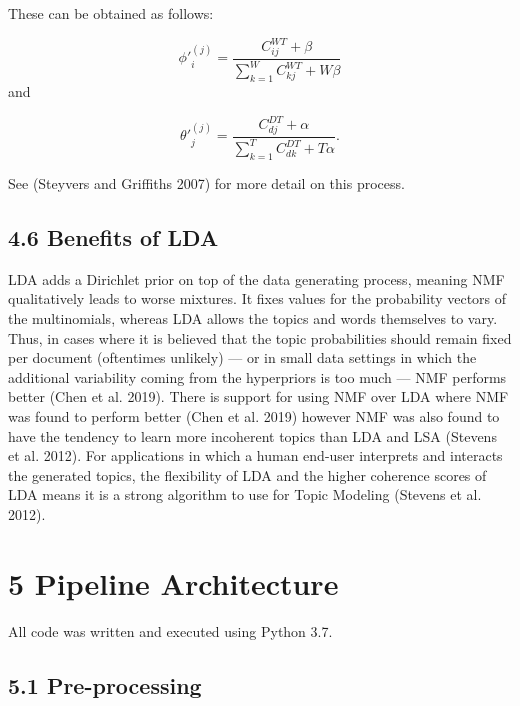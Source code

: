 \documentclass[
]{article}
\begin{document}
These can be obtained as follows:

\begin{equation}
{\phi}'^{(j)}_i= \frac{C^{WT}_{ij} + \beta}{\sum_{k=1}^{W}C^{WT}_{kj} + W\beta}
\end{equation} and

\begin{equation}
{\theta}'^{(j)}_j= \frac{C^{DT}_{dj} + \alpha}{\sum_{k=1}^{T}C^{DT}_{dk} + T\alpha}.
\end{equation}

See (Steyvers and Griffiths 2007) for more detail on this process.

\hypertarget{benefits-of-lda}{%
\subsection{4.6 Benefits of LDA}\label{benefits-of-lda}}

LDA adds a Dirichlet prior on top of the data generating process,
meaning NMF qualitatively leads to worse mixtures. It fixes values for
the probability vectors of the multinomials, whereas LDA allows the
topics and words themselves to vary. Thus, in cases where it is believed
that the topic probabilities should remain fixed per document
(oftentimes unlikely) --- or in small data settings in which the
additional variability coming from the hyperpriors is too much --- NMF
performs better (Chen et al. 2019). There is support for using NMF over
LDA where NMF was found to perform better (Chen et al. 2019) however NMF
was also found to have the tendency to learn more incoherent topics than
LDA and LSA (Stevens et al. 2012). For applications in which a human
end-user interprets and interacts the generated topics, the flexibility
of LDA and the higher coherence scores of LDA means it is a strong
algorithm to use for Topic Modeling (Stevens et al. 2012).

\newpage

\newpage

\hypertarget{pipeline-architecture}{%
\section{5 Pipeline Architecture}\label{pipeline-architecture}}

All code was written and executed using Python 3.7.

\hypertarget{pre-processing}{%
\subsection{5.1 Pre-processing}\label{pre-processing}}
\end{document}
